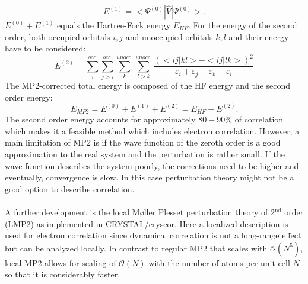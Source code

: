 \documentclass[11pt,DIV=13,BCOR=5mm,a4paper,headinclude]{scrbook}
\begin{document}
\begin{equation}
 E^{(1)} = <\Psi^{(0)}|\hat{V}|\Psi^{(0)}>.
\end{equation}
$E^{(0)}+E^{(1)}$ equals the Hartree-Fock energy $E_{HF}$.
For the energy of the second order, both occupied orbitals $i,j$ and unoccupied orbitals $k,l$ and their energy have to be considered:
\begin{equation}
 E^{(2)}=\sum\limits_{i}^{occ.}\sum\limits_{j>i}^{occ.}\sum\limits_{k}^{unocc.}\sum\limits_{l>k}^{unocc.} \frac{(<ij|kl> - <ij|lk>)^2}{\varepsilon_i + \varepsilon_j - \varepsilon_k - \varepsilon_l}
\end{equation}
The MP2-corrected total energy is composed of the HF energy and the second order energy:
\begin{equation}
 E_{MP2} = E^{(0)}+E^{(1)} + E^{(2)} = E_{HF} + E^{(2)}.
\end{equation}
The second order energy accounts for approximately $80-90\%$ of correlation which makes it a feasible method which includes electron correlation.
However, a main limitation of MP2 is if the wave function of the zeroth order is a good approximation to the real system and the perturbation is rather small.
If the wave function describes the system poorly, the corrections need to be higher and eventually, convergence is slow.
In this case perturbation theory might not be a good option to describe correlation.
\\
\\
A further development is the local M\o{}ller Plesset perturbation theory\cite{usvyat2015,usvyatbook,Maschio2007} of 2$^{\textrm{nd}}$ order (LMP2) as implemented in CRYSTAL/cryscor\cite{crystal14,cryscor}.
Here a localized description is used for electron correlation since dynamical correlation is not a long-range effect but can be analyzed locally.
In contrast to regular MP2 that scales with $\mathcal{O}(N^5)$, local MP2 allows for scaling of $\mathcal{O}(N)$ with the number of atoms per unit cell $N$ so that it is considerably faster.
\end{document}
